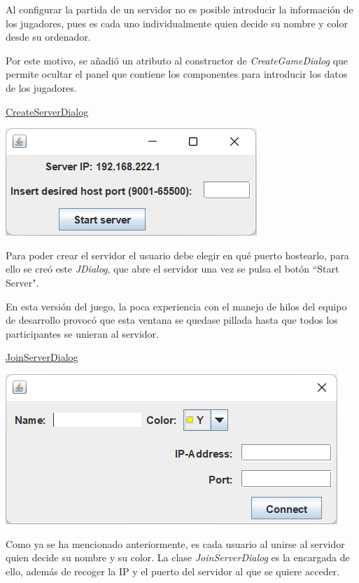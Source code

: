 \documentclass[../DocumentoOficial.tex]{subfiles}
\begin{document}
\begin{sprint}[5]
Al configurar la partida de un servidor no es posible introducir la información de los jugadores, pues es cada uno individualmente quien decide su nombre y color desde su ordenador.

Por este motivo, se añadió un atributo al constructor de \textit{CreateGameDialog} que permite ocultar el panel que contiene los componentes para introducir los datos de los jugadores.

\underline{CreateServerDialog}
\begin{center}
\includegraphics[scale=0.93]{create-server-sprint5.png}
\end{center}

Para poder crear el servidor el usuario debe elegir en qué puerto hostearlo, para ello se creó este \textit{JDialog}, que abre el servidor una vez se pulsa el botón ``Start Server".

En esta versión del juego, la poca experiencia con el manejo de hilos del equipo de desarrollo provocó que esta ventana se quedase pillada hasta que todos los participantes se unieran al servidor.

\underline{JoinServerDialog}
\begin{center}
\includegraphics[scale=0.8]{join-server-sprint5.png}
\end{center}

Como ya se ha mencionado anteriormente, es cada usuario al unirse al servidor quien decide su nombre y su color. La clase \textit{JoinServerDialog} es la encargada de ello, además de recoger la IP y el puerto del servidor al que se quiere acceder.


\end{sprint}
\end{document}
